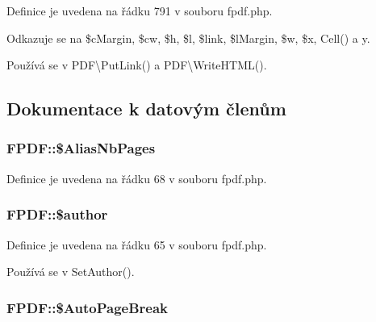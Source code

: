 Definice je uvedena na řádku 791 v souboru fpdf.\-php.



Odkazuje se na \$c\-Margin, \$cw, \$h, \$l, \$link, \$l\-Margin, \$w, \$x, Cell() a y.



Používá se v P\-D\-F\textbackslash{}\-Put\-Link() a P\-D\-F\textbackslash{}\-Write\-H\-T\-M\-L().



\subsection{Dokumentace k datovým členům}
\hypertarget{class_f_p_d_f_a8ca11347db37499aaf473e390db7459b}{
\subsubsection[{\$\-Alias\-Nb\-Pages}]{\setlength{\rightskip}{0pt plus 5cm}F\-P\-D\-F\-::\$\-Alias\-Nb\-Pages}}\label{class_f_p_d_f_a8ca11347db37499aaf473e390db7459b}


Definice je uvedena na řádku 68 v souboru fpdf.\-php.

\hypertarget{class_f_p_d_f_a0fd364189356e647c1e12ff1d264b292}{
\subsubsection[{\$author}]{\setlength{\rightskip}{0pt plus 5cm}F\-P\-D\-F\-::\$author}}\label{class_f_p_d_f_a0fd364189356e647c1e12ff1d264b292}


Definice je uvedena na řádku 65 v souboru fpdf.\-php.



Používá se v Set\-Author().

\hypertarget{class_f_p_d_f_ad196be21405b44433e08efedf63fcf27}{
\subsubsection[{\$\-Auto\-Page\-Break}]{\setlength{\rightskip}{0pt plus 5cm}F\-P\-D\-F\-::\$\-Auto\-Page\-Break}}\label{class_f_p_d_f_ad196be21405b44433e08efedf63fcf27}


